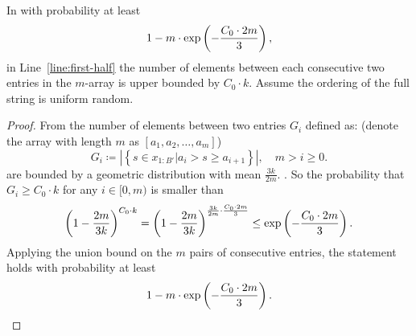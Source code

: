 \begin{lemma}\label{lemma.4}
In  with probability at least 
   \begin{align}
       1-   m\cdot \exp\left(-\frac{C_0\cdot 2m}{3}\right),\notag
   \end{align}
    in Line~\ref{line:first-half} the number of elements between each consecutive two entries in the $m$-array is upper bounded by $C_0 \cdot k$. Assume the ordering of the full string is uniform random.
  \end{lemma}
  \begin{proof}
    From  the number of elements between two entries $G_i$ defined as: (denote the array with length $m$ as $[a_1, a_2, \ldots, a_m]$)
    \[
    G_i \coloneqq \left|\left\{s\in x_{1:B'}| a_i > s \ge a_{i+1}\right\}\right|, \quad m >i\ge 0.
    \]
     are bounded by a geometric distribution with mean $\frac{3k}{2m}$. . So the probability that $G_i \ge C_0\cdot k$ for any $i\in [0, m)$ is smaller than
  \begin{align}
     \left(1- \frac{2m}{3k}\right)^{C_0\cdot k} =  \left(1- \frac{2m}{3k}\right)^{\frac{3k}{2m}\cdot \frac{C_0\cdot 2m}{3}} \le \exp\left(-\frac{C_0\cdot 2m}{3}\right).  \notag
  \end{align}
Applying the union bound on the $m$ pairs of consecutive entries, the statement holds with probability at least 
\begin{align}
  1-  m\cdot \exp\left(-\frac{C_0\cdot 2m}{3}\right).  \notag
\end{align}
  \end{proof}